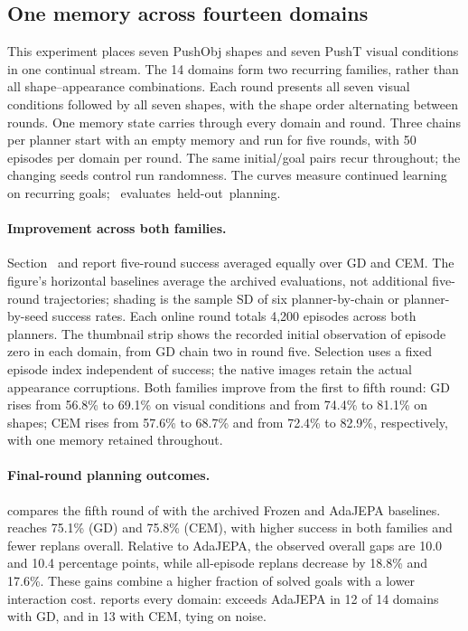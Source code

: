 \subsection{One memory across fourteen domains}
\label{app:mixed14}

This experiment places seven PushObj shapes and seven PushT visual conditions in one continual stream. The 14 domains form two recurring families, rather than all shape--appearance combinations. Each round presents all seven visual conditions followed by all seven shapes, with the shape order alternating between rounds. One memory state carries through every domain and round. Three chains per planner start with an empty memory and run for five rounds, with 50 episodes per domain per round. The same initial/goal pairs recur throughout; the changing seeds control run randomness. The curves measure continued learning on recurring goals; \mbox{ evaluates held-out planning}.

\paragraph{Improvement across both families.}
Section~ and  report five-round success averaged equally over GD and CEM. The figure's horizontal baselines average the archived evaluations, not additional five-round trajectories; shading is the sample SD of six planner-by-chain or planner-by-seed success rates. Each online round totals 4,200 episodes across both planners. The thumbnail strip shows the recorded initial observation of episode zero in each domain, from GD chain two in round five. Selection uses a fixed episode index independent of success; the native images retain the actual appearance corruptions. Both families improve from the first to fifth round: GD rises from 56.8\% to 69.1\% on visual conditions and from 74.4\% to 81.1\% on shapes; CEM rises from 57.6\% to 68.7\% and from 72.4\% to 82.9\%, respectively, with one memory retained throughout.

\paragraph{Final-round planning outcomes.}
 compares the fifth round of \ours with the archived Frozen and AdaJEPA baselines. \ours reaches 75.1\% (GD) and 75.8\% (CEM), with higher success in both families and fewer replans overall. Relative to AdaJEPA, the observed overall gaps are 10.0 and 10.4 percentage points, while all-episode replans decrease by 18.8\% and 17.6\%. These gains combine a higher fraction of solved goals with a lower interaction cost.  reports every domain: \ours exceeds AdaJEPA in 12 of 14 domains with GD, and in 13 with CEM, tying on noise.

